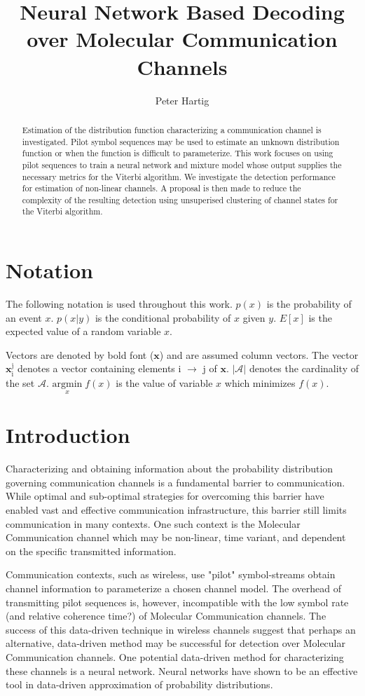 \documentclass[12pt,a4paper]{article}
\title{Neural Network Based Decoding over Molecular Communication Channels}
\author{Peter Hartig}
\begin{document}
\maketitle

\begin{abstract}
Estimation of the distribution function characterizing a communication channel is investigated. Pilot symbol sequences may be used to estimate an unknown distribution function or when the function is difficult to parameterize. This work focuses on using pilot sequences to train a neural network and mixture model whose output supplies the necessary metrics for the Viterbi algorithm. We investigate the detection performance for estimation of non-linear channels. A proposal is then made to reduce the complexity of the resulting detection using unsuperised clustering of channel states for the Viterbi algorithm. 
\end{abstract}

\newpage
\tableofcontents
\newpage
\section{Notation}
The following notation is used throughout this work.
$p(x)$ is the probability of an event $x$.
$p(x|y)$ is the conditional probability of $x$ given $y$.
$E[x]$ is the expected value of a random variable $x$.

Vectors  are denoted by bold font ($\mathbf{x}$) and are assumed column vectors.
The vector $\mathbf{x}_{\mathrm{i}}^{\mathrm{j}}$ denotes a vector containing elements i $\rightarrow$ j of $\mathbf{x}$. $|\mathcal{A}|$ denotes the cardinality of the set $\mathcal{A}$.
$\underset{x}{\text{argmin}} \; f(x)$ is the value of variable $x$ which minimizes $f(x)$.

\section{Introduction}
Characterizing and obtaining information about the probability distribution governing communication channels is a fundamental barrier to communication. While optimal and sub-optimal strategies for overcoming this barrier have enabled vast and effective communication infrastructure, this barrier still limits communication in many contexts. One such context is the Molecular Communication channel which may be non-linear, time variant, and dependent on the specific transmitted information.
\par
Communication contexts, such as wireless, use "pilot" symbol-streams obtain channel information to parameterize a chosen channel model. The overhead of transmitting pilot sequences is, however, incompatible with the low symbol rate (and relative coherence time?) of Molecular Communication channels. The success of this data-driven technique in wireless channels suggest that perhaps an alternative, data-driven method may be successful for detection over Molecular Communication channels. One potential data-driven method for characterizing these channels is a neural network. Neural networks have shown to be an effective tool in data-driven approximation of probability distributions.
\par
\end{document}
